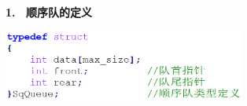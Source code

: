 {\textbf{1. ~顺序队的定义}}

{\textbf{\includegraphics[width=3.12500in,height=0.90625in]{png-jpeg-pics/1D74C5110FF61D46264C806E224DEA1C.png}\\
}}

